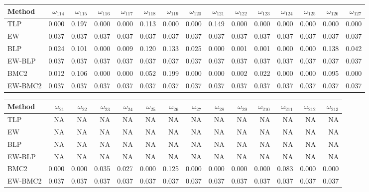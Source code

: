 \documentclass[
]{article}
\begin{document}
\begin{tabular}{lrrrrrrrrrrrrrr}
\toprule
Method & $\omega_{114}$ & $\omega_{115}$ & $\omega_{116}$ & $\omega_{117}$ & $\omega_{118}$ & $\omega_{119}$ & $\omega_{120}$ & $\omega_{121}$ & $\omega_{122}$ & $\omega_{123}$ & $\omega_{124}$ & $\omega_{125}$ & $\omega_{126}$ & $\omega_{127}$\\
\midrule
TLP & 0.000 & 0.197 & 0.000 & 0.000 & 0.113 & 0.000 & 0.000 & 0.149 & 0.000 & 0.000 & 0.000 & 0.000 & 0.000 & 0.000\\
EW & 0.037 & 0.037 & 0.037 & 0.037 & 0.037 & 0.037 & 0.037 & 0.037 & 0.037 & 0.037 & 0.037 & 0.037 & 0.037 & 0.037\\
BLP & 0.024 & 0.101 & 0.000 & 0.009 & 0.120 & 0.133 & 0.025 & 0.000 & 0.001 & 0.001 & 0.000 & 0.000 & 0.138 & 0.042\\
EW-BLP & 0.037 & 0.037 & 0.037 & 0.037 & 0.037 & 0.037 & 0.037 & 0.037 & 0.037 & 0.037 & 0.037 & 0.037 & 0.037 & 0.037\\
BMC2 & 0.012 & 0.106 & 0.000 & 0.000 & 0.052 & 0.199 & 0.000 & 0.000 & 0.002 & 0.022 & 0.000 & 0.000 & 0.095 & 0.000\\
EW-BMC2 & 0.037 & 0.037 & 0.037 & 0.037 & 0.037 & 0.037 & 0.037 & 0.037 & 0.037 & 0.037 & 0.037 & 0.037 & 0.037 & 0.037\\
\bottomrule
\end{tabular}

\begin{tabular}{lrrrrrrrrrrrrr}
\toprule
Method & $\omega_{21}$ & $\omega_{22}$ & $\omega_{23}$ & $\omega_{24}$ & $\omega_{25}$ & $\omega_{26}$ & $\omega_{27}$ & $\omega_{28}$ & $\omega_{29}$ & $\omega_{210}$ & $\omega_{211}$ & $\omega_{212}$ & $\omega_{213}$\\
\midrule
TLP & NA & NA & NA & NA & NA & NA & NA & NA & NA & NA & NA & NA & NA\\
EW & NA & NA & NA & NA & NA & NA & NA & NA & NA & NA & NA & NA & NA\\
BLP & NA & NA & NA & NA & NA & NA & NA & NA & NA & NA & NA & NA & NA\\
EW-BLP & NA & NA & NA & NA & NA & NA & NA & NA & NA & NA & NA & NA & NA\\
BMC2 & 0.000 & 0.000 & 0.035 & 0.027 & 0.000 & 0.125 & 0.000 & 0.000 & 0.000 & 0.000 & 0.083 & 0.000 & 0.000\\
EW-BMC2 & 0.037 & 0.037 & 0.037 & 0.037 & 0.037 & 0.037 & 0.037 & 0.037 & 0.037 & 0.037 & 0.037 & 0.037 & 0.037\\
\bottomrule
\end{tabular}
\end{document}
